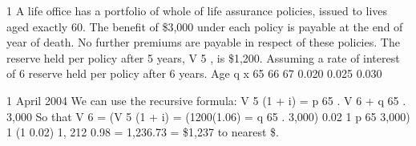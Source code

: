 \documentclass[a4paper,12pt]{article}
\begin{document}
1
A life office has a portfolio of whole of life assurance policies, issued to lives aged
exactly 60. The benefit of \$3,000 under each policy is payable at the end of year of
death. No further premiums are payable in respect of these policies.
The reserve held per policy after 5 years, V 5 , is \$1,200.
Assuming a rate of interest of 6%
reserve held per policy after 6 years.
Age q x
65
66
67 0.020
0.025
0.030

1
April 2004
\newpage
We can use the recursive formula:
V 5 (1 + i) = p 65 . V 6 + q 65 . 3,000
So that
V 6
= (V 5 (1 + i)
= (1200(1.06)
=
q 65 . 3,000)
0.02
1
p 65
3,000)
1
(1 0.02)
1, 212
0.98
= 1,236.73
= \$1,237 to nearest \$.
\end{document}
